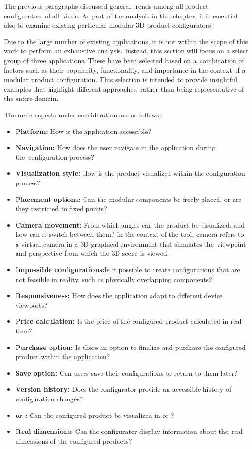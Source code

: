 The previous paragraphs discussed general trends among all product configurators of all kinds. As part of the analysis in this chapter, it is essential also to examine existing particular modular 3D product configurators. 

Due to the large number of existing applications, it is not within the scope of this work to perform an exhaustive analysis. Instead, this section will focus on a select group of three applications. These have been selected based on a~combination of factors such as their popularity, functionality, and importance in the context of a modular product configuration. This selection is intended to provide insightful examples that highlight different approaches, rather than being representative of the entire domain.

\noindent The main aspects under consideration are as follows:\nopagebreak
\begin{itemize}[label=\rectanglebullet]
    \item \textbf{Platform:} How is the application accessible?
    \item \textbf{Navigation:} How does the user navigate in the application during the~configuration process?
    \item \textbf{Visualization style:} How is the product visualized within the configuration process?
    \item \textbf{Placement options:} Can the modular components be freely placed, or are they restricted to fixed points?
    \item \textbf{Camera movement:} From which angles can the product be visualized, and how can it switch between them? In the context of the tool, camera refers to a virtual camera in a 3D graphical environment that simulates the~viewpoint and perspective from which the 3D scene is viewed.
    \item \textbf{Impossible configurations:}Is it possible to create configurations that are not feasible in reality, such as physically overlapping components?
    \item \textbf{Responsiveness:} How does the application adapt to different device viewports?
    \item \textbf{Price calculation:} Is the price of the configured product calculated in real-time?
    \item \textbf{Purchase option:} Is there an option to finalize and purchase the configured product within the application?
    \item \textbf{Save option:} Can users save their configurations to return to them later?
    \item \textbf{Version history:} Does the configurator provide an accessible history of configuration changes?
    \item \textbf{ or :} Can the configured product be visualized in  or ?
    \item \textbf{Real dimensions}: Can the configurator display information about the~real dimensions of the configured products? 
\end{itemize}
